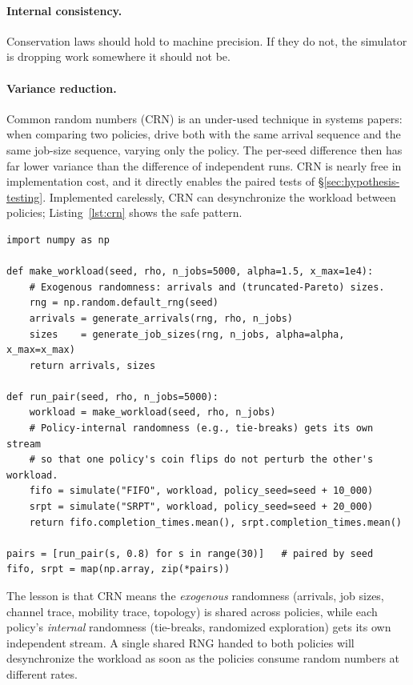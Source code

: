\documentclass[11pt]{article}
\begin{document}
\paragraph{Internal consistency.} Conservation laws should hold to machine precision. If they do not, the simulator is dropping work somewhere it should not be.

\paragraph{Variance reduction.} Common random numbers (CRN) is an under-used technique in systems papers: when comparing two policies, drive both with the same arrival sequence and the same job-size sequence, varying only the policy. The per-seed difference then has far lower variance than the difference of independent runs. CRN is nearly free in implementation cost, and it directly enables the paired tests of \S\ref{sec:hypothesis-testing}. Implemented carelessly, CRN can desynchronize the workload between policies; Listing~\ref{lst:crn} shows the safe pattern.

\begin{lstlisting}[caption={Common random numbers: generate the workload \emph{once} per seed and replay it under each policy. Seeding two policies with the same RNG is not enough, because the policies may consume random numbers in different orders.},label={lst:crn}]
import numpy as np

def make_workload(seed, rho, n_jobs=5000, alpha=1.5, x_max=1e4):
    # Exogenous randomness: arrivals and (truncated-Pareto) sizes.
    rng = np.random.default_rng(seed)
    arrivals = generate_arrivals(rng, rho, n_jobs)
    sizes    = generate_job_sizes(rng, n_jobs, alpha=alpha, x_max=x_max)
    return arrivals, sizes

def run_pair(seed, rho, n_jobs=5000):
    workload = make_workload(seed, rho, n_jobs)
    # Policy-internal randomness (e.g., tie-breaks) gets its own stream
    # so that one policy's coin flips do not perturb the other's workload.
    fifo = simulate("FIFO", workload, policy_seed=seed + 10_000)
    srpt = simulate("SRPT", workload, policy_seed=seed + 20_000)
    return fifo.completion_times.mean(), srpt.completion_times.mean()

pairs = [run_pair(s, 0.8) for s in range(30)]   # paired by seed
fifo, srpt = map(np.array, zip(*pairs))
\end{lstlisting}

The lesson is that CRN means the \emph{exogenous} randomness (arrivals, job sizes, channel trace, mobility trace, topology) is shared across policies, while each policy's \emph{internal} randomness (tie-breaks, randomized exploration) gets its own independent stream. A single shared RNG handed to both policies will desynchronize the workload as soon as the policies consume random numbers at different rates.
\end{document}
